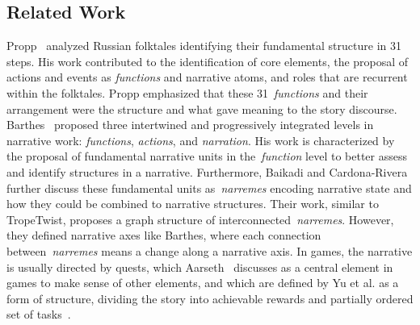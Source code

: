\subsection{Related Work}





Propp~ analyzed Russian folktales identifying their fundamental structure in 31 steps. His work contributed to the identification of core elements, the proposal of actions and events as \emph{functions} and narrative atoms, and roles that are recurrent within the folktales. Propp emphasized that these 31~\emph{functions} and their arrangement were the structure and what gave meaning to the story discourse. Barthes~ proposed three intertwined and progressively integrated levels in narrative work: \emph{functions}, \emph{actions}, and \emph{narration}. His work is characterized by the proposal of fundamental narrative units in the~\emph{function} level to better assess and identify structures in a narrative. Furthermore, Baikadi and Cardona-Rivera~ further discuss these fundamental units as~\emph{narremes} encoding narrative state and how they could be combined to narrative structures. Their work, similar to TropeTwist, proposes a graph structure of interconnected~\emph{narremes}. However, they defined narrative axes like Barthes, where each connection between~\emph{narremes} means a change along a narrative axis. In games, the narrative is usually directed by quests, which Aarseth~ discusses as a central element in games to make sense of other elements, and which are defined by Yu et al. as a form of structure, dividing the story into achievable rewards and partially ordered set of tasks~.



